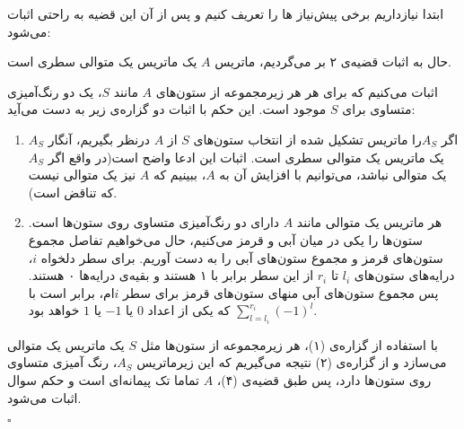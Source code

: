 \documentclass[a4paper,12pt]{article}
\begin{document}
\proof{}
ابتدا نیاز‌داریم برخی پیش‌نیاز ها را تعریف کنیم و پس از آن این قضیه به راحتی اثبات می‌شود:

\newline
\newline
\newline
حال به اثبات قضیه‌ی ۲ بر می‌گردیم، ماتریس $A$ یک ماتریس یک‌ متوالی سطری است.

اثبات می‌کنیم که برای هر هر زیرمجموعه از ستون‌های $A$ مانند $S$، یک دو رنگ‌آمیزی متساوی برای $S$ موجود است.
 این حکم با اثبات دو گزاره‌ی زیر به دست می‌آید:
\begin{enumerate}
	\item اگر $A_S$را ماتریس تشکیل شده از انتخاب ستون‌های $S$ از $A$ درنظر بگیریم، آنگار $A_S$ یک ماتریس یک متوالی سطری است. اثبات این ادعا واضح است(در واقع اگر $A_S$ یک متوالی نباشد، می‌توانیم با افزایش آن به $A$، ببینیم که $A$ نیز یک متوالی نیست که تناقض است).
	\item هر ماتریس یک متوالی مانند $A$ دارای دو رنگ‌آمیزی متساوی روی ستون‌ها است.
\proof
ستون‌ها را یکی در میان آبی و قرمز می‌کنیم، حال می‌خواهیم تفاصل مجموع ستون‌های قرمز و مجموع ستون‌های آبی را به دست آوریم. برای سطر دلخواه $i$، درایه‌های  ستون‌های $l_i$ تا $r_i$ از این سطر برابر با ۱ هستند و بقیه‌ی درایه‌ها ۰ هستند. پس مجموع ستون‌های آبی منهای ستون‌های قرمز برای سطر $i$ام، برابر است با 
$\sum_{l=l_i}^{r_i} (-1)^l$ که یکی از اعداد $0$ یا $-1$ یا $1$ خواهد بود.
\end{enumerate}
با استفاده از گزاره‌ی (۱)، هر زیرمجموعه‌ از ستون‌ها مثل $S$ یک ماتریس یک متوالی می‌سازد و از گزاره‌ی (۲) نتیجه‌ می‌گیریم که این زیرماتریس $A_S$، رنگ آمیزی متساوی روی ستون‌ها دارد، پس طبق قضیه‌ی (۴)، $A$  تماما تک پیمانه‌ای است و حکم سوال اثبات می‌شود.
\begin{latin}
	$\square$
\end{latin}
\end{document}

